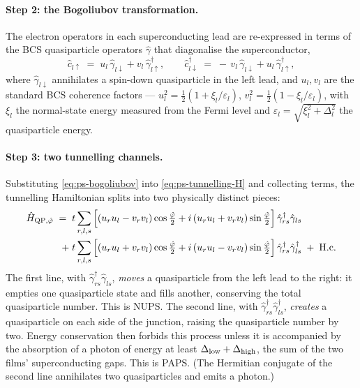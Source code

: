 \paragraph{Step 2: the Bogoliubov transformation.}
The electron operators in each superconducting lead are
re-expressed in terms of the BCS quasiparticle operators
$\hat\gamma$ that diagonalise the superconductor,
\begin{equation}
\label{eq:ps-bogoliubov}
\hat c_{l\uparrow} \;=\; u_l\,\hat\gamma_{l\downarrow}
+ v_l\,\hat\gamma_{l\uparrow}^\dagger,
\qquad
\hat c_{l\downarrow}^\dagger \;=\; -\,v_l\,\hat\gamma_{l\downarrow}
+ u_l\,\hat\gamma_{l\uparrow}^\dagger,
\end{equation}
where $\hat\gamma_{l\downarrow}$ annihilates a spin-down
quasiparticle in the left lead, and $u_l,v_l$ are the standard BCS
coherence factors --- $u_l^2=\tfrac12(1+\xi_l/\varepsilon_l)$,
$v_l^2=\tfrac12(1-\xi_l/\varepsilon_l)$, with $\xi_l$ the
normal-state energy measured from the Fermi level and
$\varepsilon_l=\sqrt{\xi_l^2+\Delta_l^2}$ the quasiparticle energy.

\paragraph{Step 3: two tunnelling channels.}
Substituting \cref{eq:ps-bogoliubov} into
\cref{eq:ps-tunnelling-H} and collecting terms, the tunnelling
Hamiltonian splits into two physically distinct pieces:
\begin{equation}
\label{eq:ps-two-channels}
\begin{aligned}
\hat{H}_{{\rm QP},\hat\varphi} \;=\; t\sum_{r,l,s}
&\left[
(u_r u_l - v_r v_l)\cos\tfrac{\hat\varphi}{2}
+ i\,(u_r u_l + v_r v_l)\sin\tfrac{\hat\varphi}{2}
\right]\hat\gamma_{rs}^\dagger\hat\gamma_{ls}\\
+\; t\sum_{r,l,s}
&\left[
(u_r u_l + v_r v_l)\cos\tfrac{\hat\varphi}{2}
+ i\,(u_r u_l - v_r v_l)\sin\tfrac{\hat\varphi}{2}
\right]\hat\gamma_{rs}^\dagger\hat\gamma_{ls}^\dagger
\;+\; \text{H.c.}
\end{aligned}
\end{equation}
The first line, with $\hat\gamma_{rs}^\dagger\hat\gamma_{ls}$,
\emph{moves} a quasiparticle from the left lead to the right: it
empties one quasiparticle state and fills another, conserving the
total quasiparticle number. This is NUPS. The second line, with
$\hat\gamma_{rs}^\dagger\hat\gamma_{ls}^\dagger$, \emph{creates} a
quasiparticle on each side of the junction, raising the
quasiparticle number by two. Energy conservation then forbids this
process unless it is accompanied by the absorption of a photon of
energy at least $\Delta_{\rm low}+\Delta_{\rm high}$, the sum of the
two films' superconducting gaps. This is PAPS. (The Hermitian
conjugate of the second line annihilates two quasiparticles and
emits a photon.)

